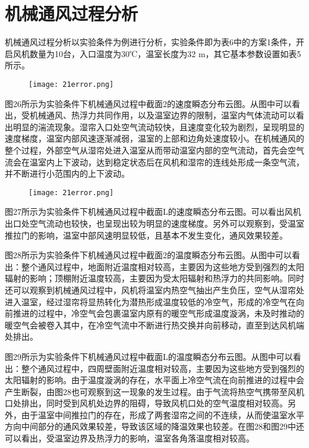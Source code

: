 \section{机械通风过程分析}
机械通风过程分析以实验条件为例进行分析，实验条件即为表6中的方案1条件，开启风机数量为10台，入口温度为30℃，温室长度为32 m，其它基本参数设置如表5所示。
		 \begin{figure}[!htp]
  			\centering
 			\texttt{[image: 21error.png]}
		\end{figure}
图26所示为实验条件下机械通风过程中截面2的速度瞬态分布云图。从图中可以看出，受机械通风、热浮力共同作用，以及温室边界的限制，温室内气体流动可以看出明显的湍流现象。湿帘入口处空气流动较快，且速度变化较为剧烈，呈现明显的速度梯度，温室内部风速逐渐减弱，温室的上部和边角处速度较小。在机械通风的整个过程，外部空气从湿帘处进入温室从而带动温室内部的空气流动，首先会空气流会在温室内上下波动，达到稳定状态后在风机和湿帘的连线处形成一条空气流，并不断进行小范围内的上下波动。
		 \begin{figure}[!htp]
  			\centering
 			\texttt{[image: 21error.png]}
		\end{figure}
图27所示为实验条件下机械通风过程中截面L的速度瞬态分布云图。可以看出风机出口处空气流动也较快，也呈现出较为明显的速度梯度。另外可以观察到，受温室推拉门的影响，温室中部风速明显较低，且基本不发生变化，通风效果较差。

图28所示为实验条件下机械通风过程中截面2的温度瞬态分布云图。从图中可以看出：整个通风过程中，地面附近温度相对较高，主要因为这些地方受到强烈的太阳辐射的影响；顶棚附近温度较高，主要因为受太阳辐射和热浮力的共同影响。同时还可以观察到机械通风过程中，风机将温室内热空气抽出产生负压，空气从湿帘处进入温室，经过湿帘将显热转化为潜热形成温度较低的冷空气，形成的冷空气在向前推进的过程中，冷空气会包裹温室内原有的暖空气形成温度漩涡，未及时推动的暖空气会被卷入其中，在冷空气流中不断进行热交换并向前移动，直至到达风机端处排出。

图29所示为实验条件下机械通风过程中截面L的温度瞬态分布云图。从图中可以看出：整个通风过程中，四周壁面附近温度相对较高，主要因为这些地方受到强烈的太阳辐射的影响。由于温度漩涡的存在，水平面上冷空气流在向前推进的过程中会产生断裂，由图28也可观察到这一现象的发生过程。由于气流将热空气携带至风机口处排出，同时受到风机处边界的阻碍，导致风机口处的空气温度相对较高。另外，由于温室中间推拉门的存在，形成了两套湿帘之间的不连续，从而使温室水平方向中间部分的通风效果较差，导致该区域的降温效果也较差。在图28和图29中还可以看出，受温室边界及热浮力的影响，温室各角落温度相对较高。

